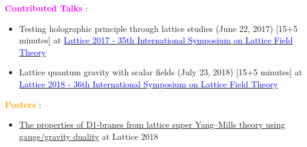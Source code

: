 
\textcolor{magenta}{\textbf{Contributed Talks}} :  

 \begin{itemize}
  \item Testing holographic principle through lattice studies (June 22, 2017) [15+5 minutes]  at \href{https://makondo.ugr.es/event/0/session/96/contribution/50}{\textcolor{blue}{Lattice 2017 - 35th International Symposium on Lattice Field Theory}}   
  \item Lattice quantum gravity with scalar fields (July 23, 2018) [15+5 minutes]  at \href{https://indico.fnal.gov/event/15949/session/15/contribution/80}{\textcolor{blue}{Lattice 2018 - 36th International Symposium on Lattice Field Theory}} 
 \end{itemize}
 
 
 \textcolor{orange}{\textbf{Posters}} :  

  \begin{itemize}
 \item \href{https://indico.fnal.gov/event/15949/session/4/contribution/66}{The properties of D1-branes from lattice super Yang--Mills theory using gauge/gravity duality} at Lattice 2018

 \end{itemize}